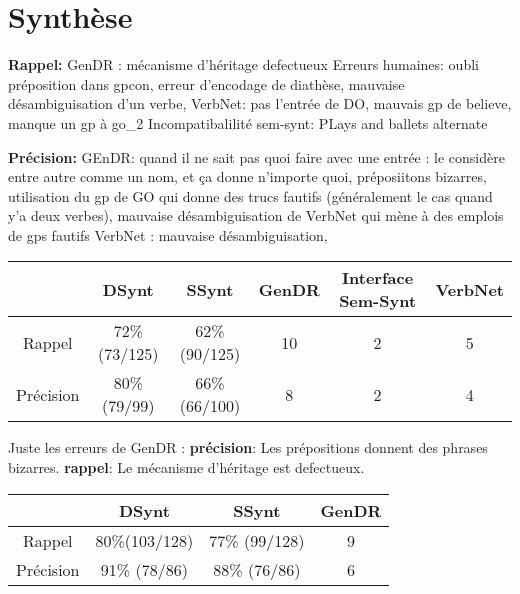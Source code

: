 \section{Synthèse}

\textbf{Rappel:}
GenDR : mécanisme d’héritage defectueux
Erreurs humaines: oubli préposition dans gpcon, erreur d’encodage de diathèse, mauvaise désambiguisation d’un verbe,
VerbNet: pas l’entrée de DO, mauvais gp de believe, manque un gp à go\_2
Incompatibalilité sem-synt: PLays and ballets alternate

\textbf{Précision:}
GEnDR: quand il ne sait pas quoi faire avec une entrée : le considère entre autre comme un nom, et ça donne n’importe quoi, préposiitons bizarres,  utilisation du gp de GO qui donne des trucs fautifs (généralement le cas quand y’a deux verbes), mauvaise désambiguisation de VerbNet qui mène à des emplois de gps fautifs
VerbNet : mauvaise désambiguisation, 


\begin{center}
 \begin{tabular}{||c c c c c c||} 
 \hline
  & DSynt & SSynt & GenDR & Interface Sem-Synt & VerbNet \\ [0.5ex] 
 \hline\hline 
 \hline
 Rappel & 72\%  (73/125) & 62\% (90/125) & 10 & 2 & 5 \\
 \hline
 Précision & 80\% (79/99) & 66\% (66/100) & 8 & 2 & 4 \\ [1ex] 
 \hline
\end{tabular}
\end{center}

Juste les erreurs de GenDR : 
\textbf{précision}: Les prépositions donnent des phrases bizarres. 
\textbf{rappel}: Le mécanisme d'héritage est defectueux.

\begin{center}
 \begin{tabular}{||c c c c||} 
 \hline
  & DSynt & SSynt & GenDR \\ [0.5ex] 
 \hline\hline 
 \hline
 Rappel & 80\%(103/128) & 77\% (99/128) & 9 \\
 \hline
 Précision & 91\% (78/86) & 88\% (76/86) & 6 \\ [1ex] 
 \hline
\end{tabular}
\end{center}

